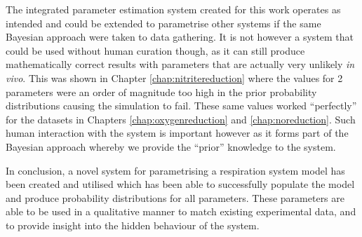 The integrated parameter estimation system created for this work operates as intended and could be extended to parametrise other systems if the same Bayesian approach were taken to data gathering. It is not however a system that could be used without human curation though, as it can still produce mathematically correct results with parameters that are actually very unlikely \textit{in vivo}. This was shown in Chapter \ref{chap:nitritereduction} where the values for 2 parameters were an order of magnitude too high in the prior probability distributions causing the simulation to fail. These same values worked ``perfectly'' for the datasets in Chapters \ref{chap:oxygenreduction} and \ref{chap:noreduction}. Such human interaction with the system is important however as it forms part of the Bayesian approach whereby we provide the ``prior'' knowledge to the system.

In conclusion, a novel system for parametrising a respiration system model has been created and utilised which has been able to successfully populate the model and produce probability distributions for all parameters. These parameters are able to be used in a qualitative manner to match existing experimental data, and to provide insight into the hidden behaviour of the system.